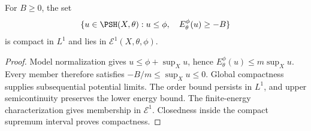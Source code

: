 \begin{corollary}\label{cor:relative-energy-compact-sublevels}
For $B\geq0$, the set
\[
 \{u\in\PSH(X,\theta):u\leq\phi,\quad E_\theta^\phi(u)\geq-B\}
\]
is compact in $L^1$ and lies in $\mathcal E^1(X,\theta,\phi)$.
\end{corollary}
\begin{proof}
Model normalization gives $u\leq\phi+\sup_Xu$, hence
$E_\theta^\phi(u)\leq m\sup_Xu$. Every member therefore satisfies $-B/m\leq\sup_Xu\leq0$. Global compactness supplies subsequential potential limits. The order bound persists in $L^1$, and upper semicontinuity preserves the lower energy bound. The finite-energy characterization gives membership in $\mathcal E^1$. Closedness inside the compact supremum interval proves compactness.
\end{proof}

